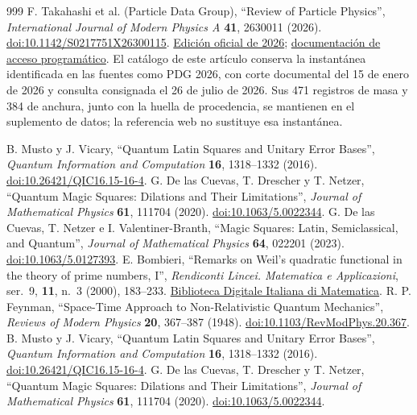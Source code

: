 \begin{thebibliography}{999}
F. Takahashi et al. (Particle Data Group),
``Review of Particle Physics'',
\emph{International Journal of Modern Physics A} \textbf{41}, 2630011 (2026).
\href{https://doi.org/10.1142/S0217751X26300115}{doi:10.1142/S0217751X26300115}.
\href{https://pdg.lbl.gov/2026/}{Edición oficial de 2026};
\href{https://pdg.lbl.gov/2026/api/index.html}{documentación de acceso programático}.
El catálogo de este artículo conserva la instantánea identificada en las fuentes
como PDG 2026, con corte documental del 15 de enero de 2026 y consulta consignada
el 26 de julio de 2026. Sus 471 registros de masa y 384 de anchura, junto con la
huella de procedencia, se mantienen en el suplemento de datos; la referencia
web no sustituye esa instantánea.

 B. Musto y J. Vicary, ``Quantum Latin Squares and Unitary Error Bases'', \emph{Quantum Information and Computation} \textbf{16}, 1318--1332 (2016). \href{https://doi.org/10.26421/QIC16.15-16-4}{doi:10.26421/QIC16.15-16-4}.
 G. De las Cuevas, T. Drescher y T. Netzer, ``Quantum Magic Squares: Dilations and Their Limitations'', \emph{Journal of Mathematical Physics} \textbf{61}, 111704 (2020). \href{https://doi.org/10.1063/5.0022344}{doi:10.1063/5.0022344}.
 G. De las Cuevas, T. Netzer e I. Valentiner-Branth, ``Magic Squares: Latin, Semiclassical, and Quantum'', \emph{Journal of Mathematical Physics} \textbf{64}, 022201 (2023). \href{https://doi.org/10.1063/5.0127393}{doi:10.1063/5.0127393}.
 E. Bombieri,
``Remarks on Weil's quadratic functional in the theory of prime numbers, I'',
\emph{Rendiconti Lincei. Matematica e Applicazioni},
ser.~9, \textbf{11}, n.~3 (2000), 183--233.
\href{https://www.bdim.eu/item?id=RLIN_2000_9_11_3_183_0}{Biblioteca Digitale Italiana di Matematica}.
 R. P. Feynman, ``Space-Time Approach to Non-Relativistic Quantum Mechanics'', \emph{Reviews of Modern Physics} \textbf{20}, 367--387 (1948). \href{https://doi.org/10.1103/RevModPhys.20.367}{doi:10.1103/RevModPhys.20.367}.
 B. Musto y J. Vicary, ``Quantum Latin Squares and Unitary Error Bases'', \emph{Quantum Information and Computation} \textbf{16}, 1318--1332 (2016). \href{https://doi.org/10.26421/QIC16.15-16-4}{doi:10.26421/QIC16.15-16-4}.
 G. De las Cuevas, T. Drescher y T. Netzer, ``Quantum Magic Squares: Dilations and Their Limitations'', \emph{Journal of Mathematical Physics} \textbf{61}, 111704 (2020). \href{https://doi.org/10.1063/5.0022344}{doi:10.1063/5.0022344}.

\end{thebibliography}
